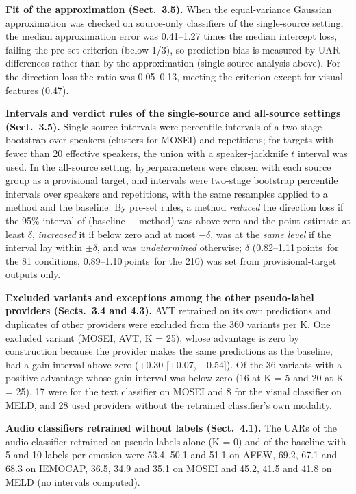 \documentclass[sn-nature,pdflatex]{sn-jnl}
\newcommand{\pt}{\,points}
\begin{document}
\textbf{Fit of the approximation (Sect.~3.5).} When the equal-variance Gaussian approximation was checked on source-only classifiers of the single-source setting, the median approximation error was 0.41--1.27 times the median intercept loss, failing the pre-set criterion (below 1/3), so prediction bias is measured by UAR differences rather than by the approximation (single-source analysis above). For the direction loss the ratio was 0.05--0.13, meeting the criterion except for visual features (0.47).

\textbf{Intervals and verdict rules of the single-source and all-source settings (Sect.~3.5).} Single-source intervals were percentile intervals of a two-stage bootstrap over speakers (clusters for MOSEI) and repetitions; for targets with fewer than 20 effective speakers, the union with a speaker-jackknife $t$ interval was used. In the all-source setting, hyperparameters were chosen with each source group as a provisional target, and intervals were two-stage bootstrap percentile intervals over speakers and repetitions, with the same resamples applied to a method and the baseline. By pre-set rules, a method \emph{reduced} the direction loss if the 95\% interval of (baseline $-$ method) was above zero and the point estimate at least $\delta$, \emph{increased} it if below zero and at most $-\delta$, was at the \emph{same level} if the interval lay within $\pm\delta$, and was \emph{undetermined} otherwise; $\delta$ (0.82--1.11\pt\ for the 81 conditions, 0.89--1.10\pt\ for the 210) was set from provisional-target outputs only.

\textbf{Excluded variants and exceptions among the other pseudo-label providers (Sects.~3.4 and 4.3).} AVT retrained on its own predictions and duplicates of other providers were excluded from the 360 variants per K. One excluded variant (MOSEI, AVT, K = 25), whose advantage is zero by construction because the provider makes the same predictions as the baseline, had a gain interval above zero (+0.30 [+0.07, +0.54]). Of the 36 variants with a positive advantage whose gain interval was below zero (16 at K = 5 and 20 at K = 25), 17 were for the text classifier on MOSEI and 8 for the visual classifier on MELD, and 28 used providers without the retrained classifier's own modality.

\textbf{Audio classifiers retrained without labels (Sect.~4.1).} The UARs of the audio classifier retrained on pseudo-labels alone (K = 0) and of the baseline with 5 and 10 labels per emotion were 53.4, 50.1 and 51.1 on AFEW, 69.2, 67.1 and 68.3 on IEMOCAP, 36.5, 34.9 and 35.1 on MOSEI and 45.2, 41.5 and 41.8 on MELD (no intervals computed).
\end{document}
